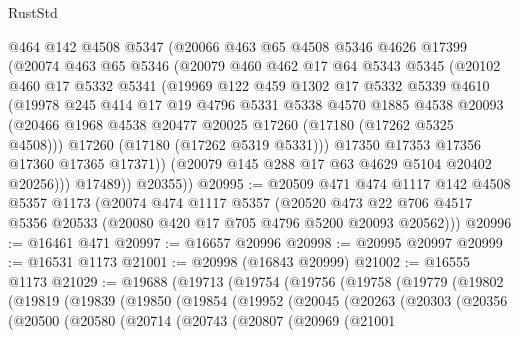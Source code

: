 \begin{lexlean}{RustStd}
\begin{coremodule}
{\begin{coremodule}
{{{{{{{{{{{{{{{{{{{{{{{{{{{{{{{{{{{{{{{{{{{{{{{{{{{{{{{          @464
          @142
          @4508
          @5347
          (@20066
            @463
            @65
            @4508
            @5346
            @4626
            @17399
            (@20074
              @463
              @65
              @5346
              (@20079
                @460
                @462
                @17
                @64
                @5343
                @5345
                (@20102
                  @460
                  @17
                  @5332
                  @5341
                  (@19969
                    @122
                    @459
                    @1302
                    @17
                    @5332
                    @5339
                    @4610
                    (@19978
                      @245
                      @414
                      @17
                      @19
                      @4796
                      @5331
                      @5338
                      @4570
                      @1885
                      @4538
                      @20093
                      (@20466 @1968 @4538 @20477 @20025 @17260 (@17180 (@17262 @5325 @4508)))
                      @17260
                      (@17180 (@17262 @5319 @5331)))
                    @17350
                    @17353
                    @17356
                    @17360
                    @17365
                    @17371))
                (@20079 @145 @288 @17 @63 @4629 @5104 @20402 @20256)))
            @17489))
        @20355))
@20995 := @20509
    @471
    @474
    @1117
    @142
    @4508
    @5357
    @1173
    (@20074
      @474
      @1117
      @5357
      (@20520 @473 @22 @706 @4517 @5356 @20533 (@20080 @420 @17 @705 @4796 @5200 @20093 @20562)))
@20996 := @16461 @471
@20997 := @16657 @20996
@20998 := @20995 @20997
@20999 := @16531 @1173
@21001 := @20998 (@16843 @20999)
@21002 := @16555 @1173
@21029 := @19688
    (@19713
      (@19754
        (@19756
          (@19758
            (@19779
              (@19802
                (@19819
                  (@19839
                    (@19850
                      (@19854
                        (@19952
                          (@20045
                            (@20263
                              (@20303
                                (@20356
                                  (@20500
                                    (@20580
                                      (@20714
                                        (@20743
                                          (@20807
                                            (@20969
                                              (@21001
}}}}}}}}}}}}}}}}}}}}}}}}}}}}}}}}}}}}}}}}}}}}}}}}}}}}}}}
\end{coremodule}}
\end{coremodule}
\end{lexlean}
